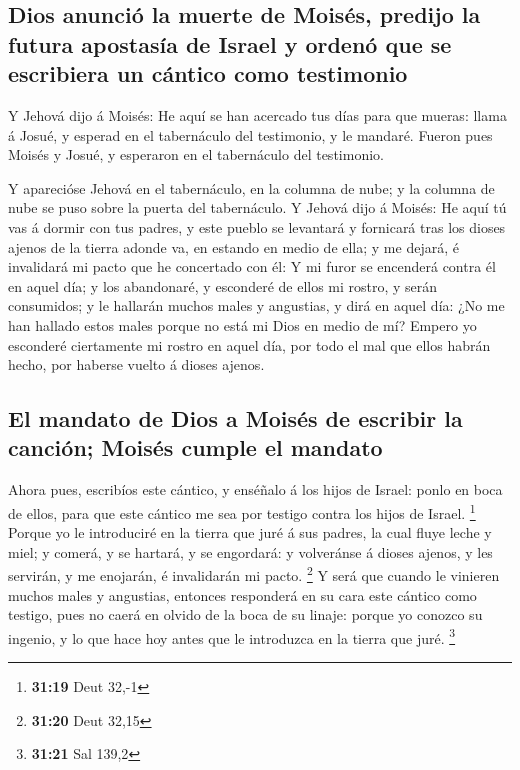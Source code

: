 \hypertarget{dios-anunciuxf3-la-muerte-de-moisuxe9s-predijo-la-futura-apostasuxeda-de-israel-y-ordenuxf3-que-se-escribiera-un-cuxe1ntico-como-testimonio}{%
\subsection{Dios anunció la muerte de Moisés, predijo la futura
apostasía de Israel y ordenó que se escribiera un cántico como
testimonio}\label{dios-anunciuxf3-la-muerte-de-moisuxe9s-predijo-la-futura-apostasuxeda-de-israel-y-ordenuxf3-que-se-escribiera-un-cuxe1ntico-como-testimonio}}

 Y Jehová dijo á Moisés: He aquí se han acercado tus días
para que mueras: llama á Josué, y esperad en el tabernáculo del
testimonio, y le mandaré. Fueron pues Moisés y Josué, y esperaron en el
tabernáculo del testimonio.

 Y aparecióse Jehová en el tabernáculo, en la columna de
nube; y la columna de nube se puso sobre la puerta del tabernáculo.
 Y Jehová dijo á Moisés: He aquí tú vas á dormir con tus
padres, y este pueblo se levantará y fornicará tras los dioses ajenos de
la tierra adonde va, en estando en medio de ella; y me dejará, é
invalidará mi pacto que he concertado con él:  Y mi furor
se encenderá contra él en aquel día; y los abandonaré, y esconderé de
ellos mi rostro, y serán consumidos; y le hallarán muchos males y
angustias, y dirá en aquel día: ¿No me han hallado estos males porque no
está mi Dios en medio de mí?  Empero yo esconderé
ciertamente mi rostro en aquel día, por todo el mal que ellos habrán
hecho, por haberse vuelto á dioses ajenos.

\hypertarget{el-mandato-de-dios-a-moisuxe9s-de-escribir-la-canciuxf3n-moisuxe9s-cumple-el-mandato}{%
\subsection{El mandato de Dios a Moisés de escribir la canción; Moisés
cumple el
mandato}\label{el-mandato-de-dios-a-moisuxe9s-de-escribir-la-canciuxf3n-moisuxe9s-cumple-el-mandato}}

 Ahora pues, escribíos este cántico, y enséñalo á los hijos
de Israel: ponlo en boca de ellos, para que este cántico me sea por
testigo contra los hijos de Israel. \footnote{\textbf{31:19} Deut 32,-1}
 Porque yo le introduciré en la tierra que juré á sus
padres, la cual fluye leche y miel; y comerá, y se hartará, y se
engordará: y volveránse á dioses ajenos, y les servirán, y me enojarán,
é invalidarán mi pacto. \footnote{\textbf{31:20} Deut 32,15}
 Y será que cuando le vinieren muchos males y angustias,
entonces responderá en su cara este cántico como testigo, pues no caerá
en olvido de la boca de su linaje: porque yo conozco su ingenio, y lo
que hace hoy antes que le introduzca en la tierra que juré. \footnote{\textbf{31:21}
  Sal 139,2}

